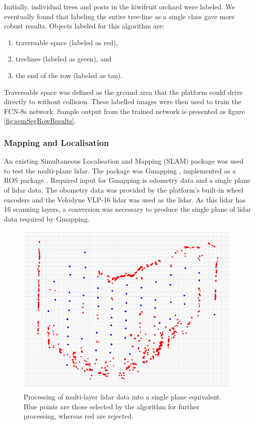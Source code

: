 \documentclass[preprint,authoryear,12pt]{elsarticle}
\begin{document}
        Initially, individual trees and posts in the kiwifruit orchard were labeled.
    	We eventually found that labeling the entire tree-line as a single class gave more robust results.
    	Objects labeled for this algorithm are:
        \begin{enumerate}
        \item traversable space (labeled as red),
        \item treelines (labeled as green), and
        \item the end of the row (labeled as tan).
        \end{enumerate}
        Traversable space was defined as the ground area that the platform could drive directly to without collision.
        These labelled images were then used to train the FCN-8s network.
    	Sample output from the trained network is presented as figure \ref{fig:semSegRowResults}.

    \subsubsection{Mapping and Localisation}
        An existing Simultaneous Localisation and Mapping (SLAM) package was used to test the multi-plane lidar.
        The package was Gmapping \citep{Grisetti2007}, implemented as a ROS package \citep{Gerkey2010}.
    	Required input for Gmapping is odometry data and a single plane of lidar data.
        The obometry data was provided by the platform's built-in wheel encoders and the Velodyne VLP-16 lidar was used as the lidar.
    	As this lidar has 16 scanning layers, a conversion was necessary to produce the single plane of lidar data required by Gmapping.

        \begin{figure}[htb]
            \centering
            \includegraphics[width=\linewidth]{imgs/single_plane_extraction/single_plane_extraction.pdf}
            \caption{
                Processing of multi-layer lidar data into a single plane equivalent.
                Blue points are those selected by the algorithm for further processing, whereas red are rejected.
            }
            \label{fig:singlePlaneExtraction}
        \end{figure}
\end{document}
